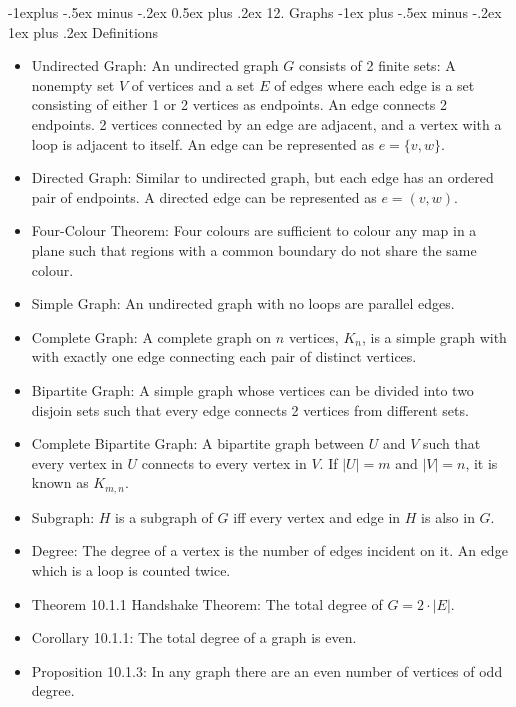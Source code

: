 \documentclass[10pt, portrait]{article}
\makeatletter
\renewcommand{\section}{\@startsection{section}{1}{0mm}%
                                {-1ex plus -.5ex minus -.2ex}%
                                {0.5ex plus .2ex}%
                                {\normalfont\large\bfseries}}
\renewcommand{\section}{\@startsection{section}{2}{0mm}%
                                {-1explus -.5ex minus -.2ex}%
                                {0.5ex plus .2ex}%
                                {\normalfont\normalsize\bfseries}}
\renewcommand{\subsection}{\@startsection{subsection}{3}{0mm}%
                                {-1ex plus -.5ex minus -.2ex}%
                                {1ex plus .2ex}%
                                {\normalfont\small\bfseries}}%
\makeatother
\begin{document}
\begin{multicols*}{2}
\section{12. Graphs}
\subsection{Definitions}
\begin{itemize}
    \item Undirected Graph: An undirected graph $G$ consists of 2 finite sets: A nonempty set $V$ of vertices and a set $E$ of edges where each edge is a set consisting of either 1 or 2 vertices as endpoints. An edge connects 2 endpoints. 2 vertices connected by an edge are adjacent, and a vertex with a loop is adjacent to itself. An edge can be represented as $e=\{v, w\}$.
    \item Directed Graph: Similar to undirected graph, but each edge has an ordered pair of endpoints. A directed edge can be represented as $e=(v,w)$.
    \item Four-Colour Theorem: Four colours are sufficient to colour any map in a plane such that regions with a common boundary do not share the same colour.
    \item Simple Graph: An undirected graph with no loops are parallel edges.
    \item Complete Graph: A complete graph on $n$ vertices, $K_n$, is a simple graph with with exactly one edge connecting each pair of distinct vertices.
    \item Bipartite Graph: A simple graph whose vertices can be divided into two disjoin sets such that every edge connects 2 vertices from different sets.
    \item Complete Bipartite Graph: A bipartite graph between $U$ and $V$ such that every vertex in $U$ connects to every vertex in $V$. If $|U|=m$ and $|V|=n$, it is known as $K_{m,n}$.
    \item Subgraph: $H$ is a subgraph of $G$ iff every vertex and edge in $H$ is also in $G$.
    \item Degree: The degree of a vertex is the number of edges incident on it. An edge which is a loop is counted twice.
    \item Theorem 10.1.1 Handshake Theorem: The total degree of $G = 2 \cdot |E|$.
    \item Corollary 10.1.1: The total degree of a graph is even.
    \item Proposition 10.1.3: In any graph there are an even number of vertices of odd degree.

\end{itemize}
\end{multicols*}
\end{document}
